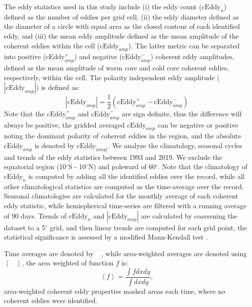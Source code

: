 \documentclass[draft,linenumbers]{agujournal2019}
\begin{document}
	The eddy statistics used in this study include (i) the eddy count ($\mathrm{cEddy}_{n}$) defined as the number of eddies per grid cell, (ii) the eddy diameter defined as the diameter of a circle with equal area as the closed contour of each identified eddy, and (iii) the mean eddy amplitude defined as the mean amplitude of the coherent eddies within the cell ($\mathrm{cEddy}_{amp}$). The latter metric can be separated into positive ($\mathrm{cEddy}_{amp}^{+}$) and negative ($\mathrm{cEddy}_{amp}^{-}$) coherent eddy amplitudes, defined as the mean amplitude of warm core and cold core coherent eddies, respectively, within the cell. 
	The polarity independent eddy amplitude ($|\mathrm{cEddy}_{amp}|$) is defined as:
	\begin{equation}
	|\mathrm{cEddy}_{amp}| = \frac{1}{2} \left(\mathrm{cEddy}_{amp}^{+} -  \mathrm{cEddy}_{amp}^{-} \right)
	\end{equation}
	Note that the $\mathrm{cEddy}_{amp}^{+}$ and $\mathrm{cEddy}_{amp}^{-}$ are sign definite, thus the difference will always be positive, the gridded averaged $\mathrm{cEddy}_{amp}$ can be negative or positive noting the dominant polarity of coherent eddies in the region, and the absolute $\mathrm{cEddy}_{amp}$ is denoted by $\mathrm{cEddy}_{|amp|}$. We analyze the climatology, seasonal cycles and trends of the eddy statistics between 1993 and 2019. We exclude the equatorial region (10$^\circ$S - 10$^\circ$N) and poleward of 60$^\circ$. Note that the climatology of $\mathrm{cEddy}_{n}$ is computed by adding all the identified eddies over the record, while all other climatological statistics are computed as the time-average over the record.  Seasonal climatologies are calculated for the monthly average of each coherent eddy statistic, while hemispherical time-series are filtered with a running average of 90 days. Trends of $\mathrm{cEddy}_{n}$ and $|\mathrm{cEddy}_{amp}|$ are calculated by coarsening the dataset to a 5$^\circ$ grid, and then linear trends are computed for each grid point, the statistical significance is assessed by a modified Mann-Kendall test \citep{Sheng_MK_2004}. 

	Time averages are denoted by $\overline{\phantom{X}}$, while area-weighted averages are denoted using $\left< \phantom{X}\right>$, the area weighted of function $f$ is:
	\begin{equation}
		\left< f \right>  = \frac{\int f dx dy}{\int dx dy},
	\end{equation}
	area-weighted coherent eddy properties masked areas each time, where no coherent eddies were identified. 
\end{document}
